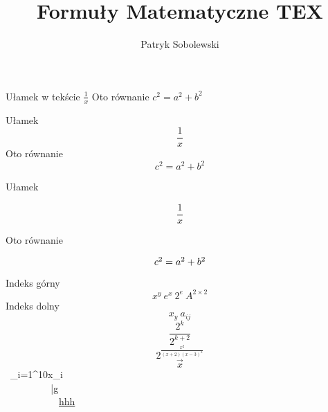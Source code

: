 \documentclass[a4paper,12pt]{article}
\title{Formuły Matematyczne TEX}
\author{Patryk Sobolewski}
\begin{document}
\maketitle

Ułamek w tekście $\frac{1}{x} $ 
Oto równanie $c^{2}=a^{2}+b^{2}$

Ułamek $$\frac{1}{x} $$ 
Oto równanie $$c^{2}=a^{2}+b^{2}$$



Ułamek

\begin{equation}
\frac{1}{x}
\label{eq:równanie1}
\end{equation}

Oto równanie

\begin{equation}
$$c^{2}=a^{2}+b^{2}$$
\label{eq:równanie2}
\end{equation}

Indeks górny $$x^{y}  \  e^{x}  \  2^{e}  \  A^{2 \times 2}$$
Indeks dolny $$ x_y  \  a_{ij} $$
$$ \frac{2^{k}}{2^{k + 2}} $$
$$  2^{\frac{x^{2}}{(x+2)(x-3)^{3}}}$$
$$  \vec{x}

$$\sum \ \sum_{i=1}^{10}x_{i} \ \prod \ \coprod \ \int \ \oint \ \bigcap \ \bigcup \ \bigsqcup \ \bigvee \ \bigwedge \ \bigodot \ \bigotimes \ \bigoplus \ \biguplus$$

$$ \  \  \  \  \  \ \bar{g} \  \  \ $$

$$ \  \  \  \  \  \  \ \underline{hhh} \  \  \ $$

$$\Gamma \ \Delta \ \Theta \ \Xi \ \Pi \ \Sigma \ \Upsilon \ \Phi \ \Psi \ \Omega$$

\section{}
\end{document}
